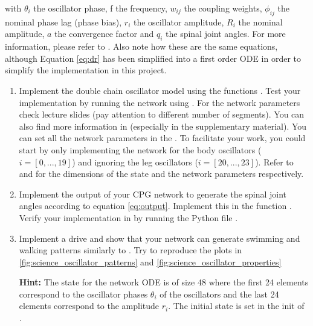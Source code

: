 \documentclass{cmc}
\begin{document}
with $ \theta_i $ the oscillator phase, f the frequency, $ w_{ij} $ the coupling
weights, $ \phi_{ij} $ the nominal phase lag (phase bias), $ r_i $ the
oscillator amplitude, $ R_i $ the nominal amplitude, $ a $ the convergence
factor and $ q_i $ the spinal joint angles. For more information, please refer
to \cite{ijspeert2007swimming}. Also note how these are the same equations,
although Equation \eqref{eq:dr} has been simplified into a first order ODE in
order to simplify the implementation in this project.


\begin{enumerate}
\item Implement the double chain oscillator model using the functions
  . Test your implementation by running the
  network using . For the network parameters check
  lecture slides (pay attention to different number of segments). You can also
  find more information in \cite{ijspeert2007swimming} (especially in the
  supplementary material). You can set all the network parameters in the
  . To facilitate your work, you
  could start by only implementing the network for the body oscillators
  ($i=[0, ..., 19]$) and ignoring the leg oscillators ($i=[20, ..., 23]$). Refer
  to  and
  \- for the dimensions of
  the state and the network parameters respectively.

\item Implement the output of your CPG network to generate the spinal joint
  angles according to equation \ref{eq:output}. Implement this in the function
  . Verify your implementation in by running
  the Python file .


\item Implement a drive and show that your network can generate swimming and
  walking patterns similarly to \cite{ijspeert2007swimming}. Try to reproduce
  the plots in \ref{fig:science_oscillator_patterns} and
  \ref{fig:science_oscillator_properties}


  \textbf{Hint:} The state for the network ODE is of size 48 where the first 24
  elements correspond to the oscillator phases $\theta_i$ of the oscillators and
  the last 24 elements correspond to the amplitude $r_i$. The initial state is
  set in the init of .
\end{enumerate}
\end{document}
